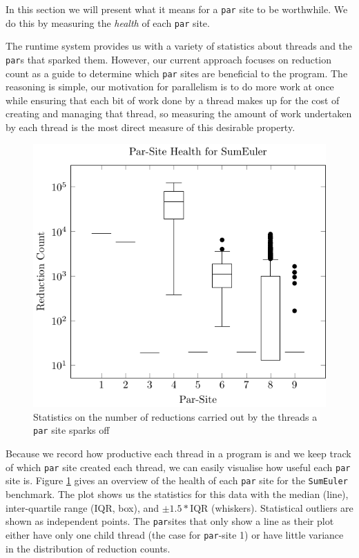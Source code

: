 In this section we will present what it means for a \verb|par| site to be
worthwhile. We do this by measuring the \emph{health} of each \verb|par| site.

The runtime system provides us with a variety of statistics about threads and
the \verb|par|s that sparked them. However, our current approach focuses on
reduction count as a guide to determine which \verb-par- sites are beneficial
to the program.  The reasoning is simple, our motivation for parallelism is to
do more work at once while ensuring that each bit of work done by a thread
makes up for the cost of creating and managing that thread, so measuring the
amount of work undertaken by each thread is the most direct measure of this
desirable property.

\begin{figure}
  \includegraphics[width=\linewidth]{Informed/Figures/threadhealth.pdf}
\caption{Statistics on the number of reductions carried out by the threads a
\texttt{par} site sparks off}
\label{fig:sumHist}
\end{figure}

Because we record how productive each thread in a program is and we keep track
of which \verb-par- site created each thread, we can easily visualise how
useful each \verb-par- site is. Figure \ref{fig:sumHist} gives an overview of
the health of each \verb-par- site for the \verb|SumEuler| benchmark. The plot
shows us the statistics for this data with the median (line), inter-quartile
range (IQR, box), and $\pm1.5 * $IQR (whiskers).  Statistical outliers are
shown as independent points. The \verb-par-sites that only show a line as their
plot either have only one child thread (the case for \verb-par--site 1) or have
little variance in the distribution of reduction counts.

